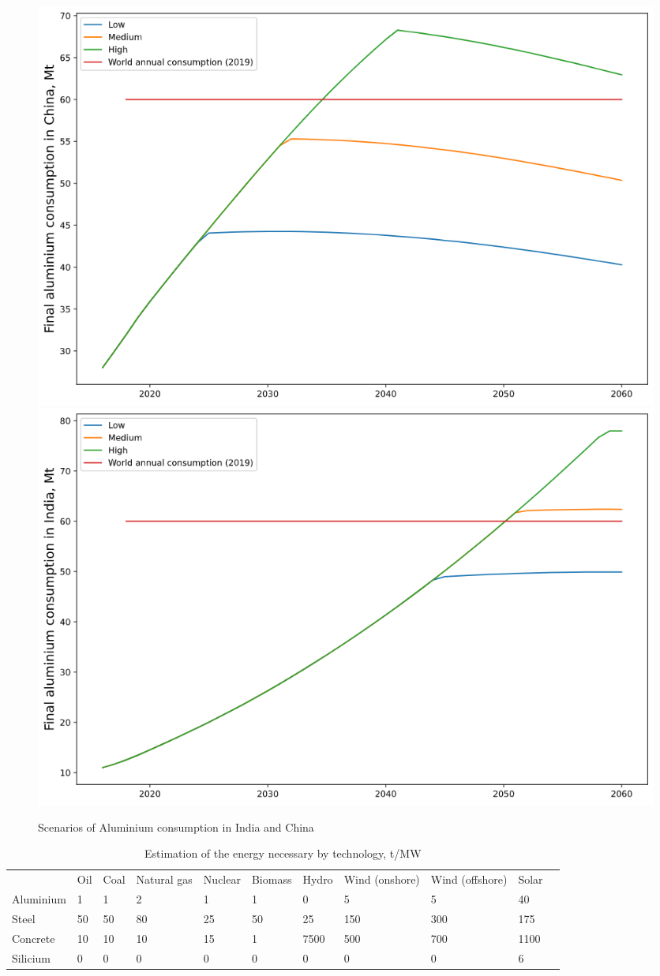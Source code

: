 \documentclass[conference]{IEEEtran}
\begin{document}
\begin{figure}
    \centering
    \includegraphics[scale=0.22]{alu-china.png}
    \includegraphics[scale=0.22]{alu-india.png}
    \caption{Scenarios of Aluminium consumption in India and China}
    \label{alupr}
\end{figure}

    

\begin{table}[]
\begin{center}
\begin{tabular}{lllllllllll}
          & Oil & Coal & Natural gas & Nuclear & Biomass & Hydro & Wind (onshore) & Wind (offshore) & Solar &  \\
Aluminium & 1   & 1    & 2           & 1       & 1       & 0     & 5              & 5               & 40    &  \\
Steel     & 50  & 50   & 80          & 25      & 50      & 25    & 150            & 300             & 175   &  \\
Concrete  & 10  & 10   & 10          & 15      & 1       & 7500  & 500            & 700             & 1100  &  \\
Silicium  & 0   & 0    & 0           & 0       & 0       & 0     & 0              & 0               & 6     &  \\

\end{tabular}
\caption{Estimation of the energy necessary by technology, t/MW \cite{vidal_matieres_2018} }
\end{center}
\end{table}
\end{document}
